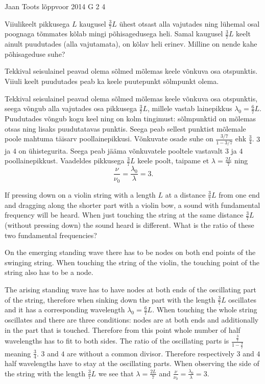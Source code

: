 {Jaan Toots} %
{lõppvoor} %
{2014} %
{G 2} %
{4} %
{
\ifStatement
Viiulikeelt pikkusega $L$ kaugusel $\frac{3}{7}L$ ühest otsast alla vajutades ning lühemal osal poognaga tõmmates kõlab mingi põhisagedusega heli. Samal kaugusel $\frac{3}{7}L$ keelt ainult puudutades (alla vajutamata), on kõlav heli erinev. Milline on nende kahe põhisageduse suhe?
\fi


\ifHint
Tekkival seisulainel peavad olema sõlmed mõlemas keele võnkuva osa otspunktis. Viiuli keelt puudutades peab ka keele puutepunkt sõlmpunkt olema.
\fi


\ifSolution
Tekkival seisulainel peavad olema sõlmed mõlemas keele võnkuva osa otspunktis, seega võngub alla vajutades osa pikkusega $\frac{3}{7}L$, millele vastab lainepikkus $\lambda_0=\frac{6}{7}L$. Puudutades võngub kogu keel ning on kolm tingimust: sõlmpunktid on mõlemas otsas ning lisaks puudutatavas punktis. Seega peab sellest punktist mõlemale poole mahtuma täisarv poollainepikkusi. Võnkuvate osade suhe on $\frac{3/7}{1-3/7}$ ehk $\frac{3}{4}$. $3$ ja $4$ on ühistegurita. Seega peab jääma võnkuvatele pooltele vastavalt $3$ ja $4$ poollainepikkust. Vaadeldes pikkusega $\frac{3}{7}L$ keele poolt, taipame et $\lambda=\frac{2L}{7}$ ning
\[
\frac{\nu}{\nu_0}=\frac{\lambda_0}{\lambda}=3.
\]
\fi


\ifEngStatement
If pressing down on a violin string with a length $L$ at a distance $\frac{3}{7}L$ from one end and dragging along the shorter part with a violin bow, a sound with fundamental frequency will be heard. When just touching the string at the same distance $\frac{3}{7}L$ (without pressing down) the sound heard is different. What is the ratio of these two fundamental frequencies?
\fi


\ifEngHint
On the emerging standing wave there has to be nodes on both end points of the swinging string. When touching the string of the violin, the touching point of the string also has to be a node.
\fi


\ifEngSolution
The arising standing wave has to have nodes at both ends of the oscillating part of the string, therefore when sinking down the part with the length $\frac{3}{7}L$ oscillates and it has a corresponding wavelength $\lambda_0=\frac{6}{7}L$. When touching the whole string oscillates and there are three conditions: nodes are at both ends and additionally in the part that is touched. Therefore from this point whole number of half wavelengths has to fit to both sides. The ratio of the oscillating parts is $\frac{\frac{3}{7}}{1-\frac{3}{7}}$ meaning $\frac{3}{4}$. $3$ and $4$ are without a common divisor. Therefore respectively $3$ and $4$ half wavelengths have to stay at the oscillating parts. When observing the side of the string with the length $\frac{3}{7}L$ we see that $\lambda=\frac{2L}{7}$ and $\frac{\nu}{\nu_0}=\frac{\lambda_0}{\lambda}=3$.
\fi
}